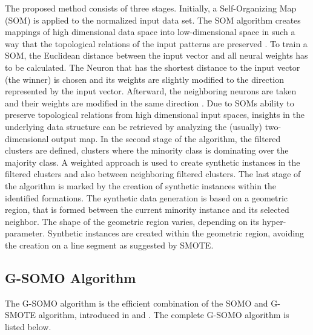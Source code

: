 \documentclass[parskip=full]{scrartcl}
\begin{document}
The proposed method consists of three stages. Initially, a Self-Organizing Map
 (SOM) is applied to the normalized input data set. The SOM algorithm creates
 mappings of high dimensional data space into low-dimensional space in such a
 way that the topological relations of the input patterns are preserved
 \cite{KOKUER2007}. To train a SOM, the Euclidean distance between the input
 vector and all neural weights has to be calculated. The Neuron that has the
 shortest distance to the input vector (the winner) is chosen and its weights
 are slightly modified to the direction represented by the input vector.
 Afterward, the neighboring neurons are taken and their weights are modified in
 the same direction \cite{Brocki2007}. Due to SOMs ability to preserve
 topological relations from high dimensional input spaces, insights in the
 underlying data structure can be retrieved by analyzing the (usually)
 two-dimensional output map. In the second stage of the algorithm, the filtered
 clusters are defined, clusters where the minority class is dominating over the
 majority class. A weighted approach is used to create synthetic instances in
 the filtered clusters and also between neighboring filtered clusters. The last
 stage of the algorithm is marked by the creation of synthetic instances within
 the identified formations. The synthetic data generation is based on a
 geometric region, that is formed between the current minority instance and its
 selected neighbor. The shape of the geometric region varies, depending on its
 hyper-parameter. Synthetic instances are created within the geometric region,
 avoiding the creation on a line segment as suggested by SMOTE. 

\subsection{G-SOMO Algorithm}

The G-SOMO algorithm is the efficient combination of the SOMO and G-SMOTE
algorithm, introduced in \cite{Douzas2017B} and \cite{Douzas2017}. The complete
G-SOMO algorithm is listed below.
\end{document}

